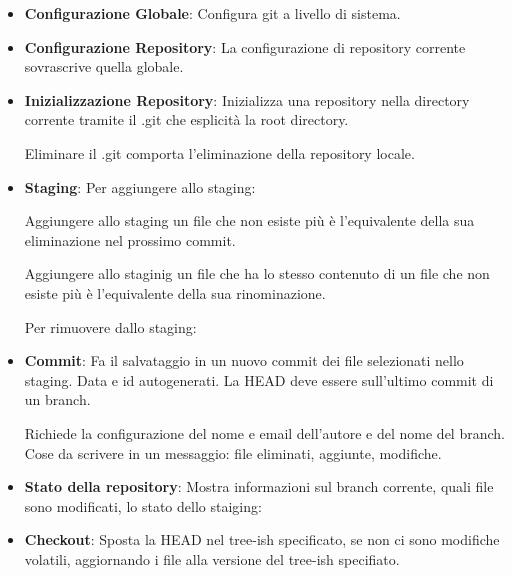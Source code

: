 \begin{itemize}
	\item \textbf{Configurazione Globale}: Configura git a livello di sistema.


	\item \textbf{Configurazione Repository}: La configurazione di repository corrente sovrascrive quella globale.


	\item \textbf{Inizializzazione Repository}: Inizializza una repository nella directory corrente tramite il .git che esplicità la root directory.


	Eliminare il .git comporta l'eliminazione della repository locale.

	\item \textbf{Staging}: Per aggiungere allo staging:


	Aggiungere allo staging un file che non esiste più è l'equivalente della sua eliminazione nel prossimo commit.

	Aggiungere allo staginig un file che ha lo stesso contenuto di un file che non esiste più è l'equivalente della sua rinominazione.

	Per rimuovere dallo staging:


	\item \textbf{Commit}: Fa il salvataggio in un nuovo commit dei file selezionati nello staging. Data e id autogenerati.
	La HEAD deve essere sull'ultimo commit di un branch.


	Richiede la configurazione del nome e email dell'autore e del nome del branch.
	Cose da scrivere in un messaggio: file eliminati, aggiunte, modifiche.

	\item \textbf{Stato della repository}: Mostra informazioni sul branch corrente, quali file sono modificati, lo stato dello staiging:


	\item \textbf{Checkout}: Sposta la HEAD nel tree-ish specificato, se non ci sono modifiche volatili, aggiornando i file alla versione del tree-ish specifiato.


\end{itemize}
